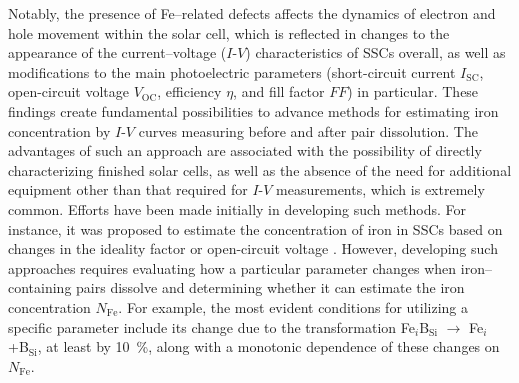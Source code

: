 \documentclass[a4paper,fleqn]{cas-sc}
\begin{document}
Notably, the presence of Fe--related defects affects the dynamics of electron and hole movement within the solar cell,
which is reflected in changes to the appearance of the current--voltage ($I$-$V$) characteristics of SSCs overall,
as well as modifications to the main photoelectric parameters
(short-circuit current  $I_\mathrm{SC}$,
open-circuit voltage $V_\mathrm{OC}$,
efficiency $\eta$, and fill factor $F\!F$)
in particular.
These findings create fundamental possibilities to advance methods for estimating iron concentration by $I$-$V$ curves measuring before and after pair dissolution.
The advantages of such an approach are associated with the possibility of directly characterizing finished solar cells,
as well as the absence of the need for additional equipment other than that required for $I$-$V$ measurements, which is extremely common.
Efforts have been made initially in developing such methods.
For instance, it was proposed to estimate the concentration of iron in SSCs based on changes in the ideality factor \cite{Olikh2019SM,Olikh2022PPV}
or open-circuit voltage \cite{Herguth2022}.
However, developing such approaches requires evaluating how a particular parameter changes when iron--containing pairs dissolve
and determining whether it can estimate the iron concentration $N_\mathrm{Fe}$.
For example, the most evident conditions for utilizing a specific parameter include its change due to the transformation
Fe$_i$B$_\mathrm{Si}$ $\rightarrow$ Fe$_i$ +B$_\mathrm{Si}$,
at least by 10~\%, along with a monotonic dependence of these changes on $N_\mathrm{Fe}$.
\end{document}
